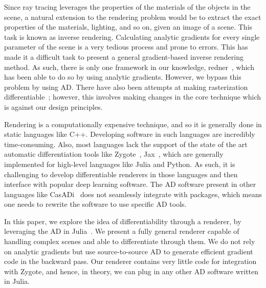 \documentclass{juliacon}
\begin{document}
Since ray tracing leverages the properties of the materials of the objects in the scene, a natural extension to the rendering problem would be to extract the exact properties of the materials, lighting, and so on, given an image of a scene. This task is known as inverse rendering. Calculating analytic gradients for every single parameter of the scene is a very tedious process and prone to errors. This has made it a difficult task to present a general gradient-based inverse rendering method. As such, there is only one framework in our knowledge, redner~\cite{Li:2018:DMC}, which has been able to do so by using analytic gradients. However, we bypass this problem by using AD. There have also been attempts at making rasterization differentiable~\cite{softraster}; however, this involves making changes in the core technique which is against our design principles.


Rendering is a computationally expensive technique, and so it is generally done in static languages like C++. Developing software in such languages are incredibly time-consuming. Also, most languages lack the support of the state of the art automatic differentiation tools like Zygote~\cite{DBLP:journals/corr/abs-1810-07951}, Jax~\cite{jax}, which are generally implemented for high-level languages like Julia and Python. As such, it is challenging to develop differentiable renderers in those languages and then interface with popular deep learning software. The AD software present in other languages like CasADi~\cite{casadi} does not seamlessly integrate with packages, which means one needs to rewrite the software to use specific AD tools.

In this paper, we explore the idea of differentiability through a renderer, by leveraging the AD in Julia~\cite{bezanson2017julia}. We present a fully general renderer capable of handling complex scenes and able to differentiate through them. We do not rely on analytic gradients but use source-to-source AD to generate efficient gradient code in the backward pass. Our renderer contains very little code for integration with Zygote, and hence, in theory, we can plug in any other AD software written in Julia.
\end{document}
